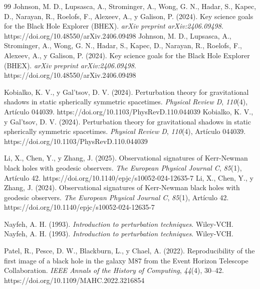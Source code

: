\documentclass[twoside,onehalfspace]{./Portada/unmsmtesis}
\begin{document}
\begin{thebibliography}{99}
 Johnson, M. D., Lupsasca, A., Strominger, A., Wong, G. N., Hadar, S., Kapec, D., Narayan, R., Roelofs, F., Alexeev, A., y Galison, P. (2024). Key science goals for the Black Hole Explorer (BHEX). \textit{arXiv preprint arXiv:2406.09498}. https://doi.org/10.48550/arXiv.2406.09498
 Johnson, M. D., Lupsasca, A., Strominger, A., Wong, G. N., Hadar, S., Kapec, D., Narayan, R., Roelofs, F., Alexeev, A., y Galison, P. (2024). Key science goals for the Black Hole Explorer (BHEX). \textit{arXiv preprint arXiv:2406.09498}. https://doi.org/10.48550/arXiv.2406.09498

 Kobialko, K. V., y Gal'tsov, D. V. (2024). Perturbation theory for gravitational shadows in static spherically symmetric spacetimes. \textit{Physical Review D}, \textit{110}(4), Artículo 044039. https://doi.org/10.1103/PhysRevD.110.044039
 Kobialko, K. V., y Gal'tsov, D. V. (2024). Perturbation theory for gravitational shadows in static spherically symmetric spacetimes. \textit{Physical Review D}, \textit{110}(4), Artículo 044039. https://doi.org/10.1103/PhysRevD.110.044039

 Li, X., Chen, Y., y Zhang, J. (2025). Observational signatures of Kerr-Newman black holes with geodesic observers. \textit{The European Physical Journal C}, \textit{85}(1), Artículo 42. https://doi.org/10.1140/epjc/s10052-024-12635-7
 Li, X., Chen, Y., y Zhang, J. (2024). Observational signatures of Kerr-Newman black holes with geodesic observers. \textit{The European Physical Journal C}, \textit{85}(1), Artículo 42. https://doi.org/10.1140/epjc/s10052-024-12635-7

 Nayfeh, A. H. (1993). \textit{Introduction to perturbation techniques}. Wiley-VCH.
 Nayfeh, A. H. (1993). \textit{Introduction to perturbation techniques}. Wiley-VCH.

 Patel, R., Pesce, D. W., Blackburn, L., y Chael, A. (2022). Reproducibility of the first image of a black hole in the galaxy M87 from the Event Horizon Telescope Collaboration. \textit{IEEE Annals of the History of Computing}, \textit{44}(4), 30–42. https://doi.org/10.1109/MAHC.2022.3216854


\end{thebibliography}
\end{document}
